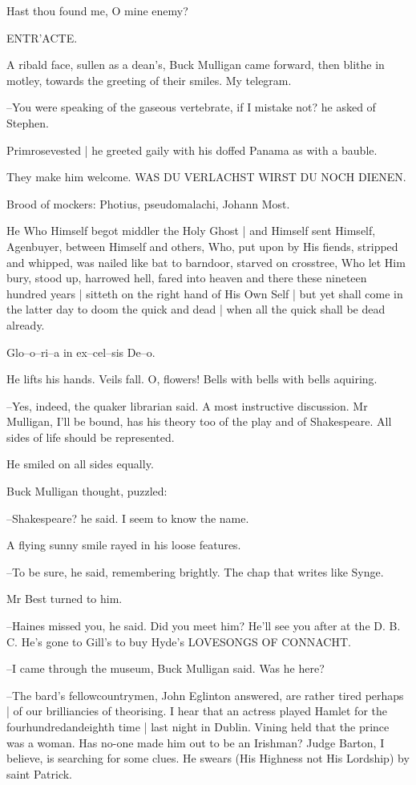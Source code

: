 Hast thou found me,
O mine enemy?

ENTR'ACTE.

A ribald face,
sullen as a dean's,
Buck Mulligan came forward,
then blithe in motley,
towards the greeting of their smiles.
My telegram.

--You were speaking of the gaseous vertebrate,
if I mistake not?
he asked of Stephen.

Primrosevested |
he greeted gaily with his doffed Panama as with a bauble.

They make him welcome.
WAS DU VERLACHST WIRST DU NOCH DIENEN.

Brood of mockers:
Photius,
pseudomalachi,
Johann Most.

He Who Himself begot middler the Holy Ghost |
and Himself sent Himself,
Agenbuyer,
between Himself and others,
Who,
put upon by His fiends,
stripped and whipped,
was nailed like bat to barndoor,
starved on crosstree,
Who let Him bury,
stood up,
harrowed hell,
fared into heaven and there these nineteen hundred years |
sitteth on the right hand of His Own Self |
but yet shall come in the latter day to doom the quick and dead |
when all the quick shall be dead already.

Glo--o--ri--a in ex--cel--sis De--o.

He lifts his hands.
Veils fall.
O, flowers!
Bells with bells with bells aquiring.

--Yes, indeed,
the quaker librarian said.
A most instructive discussion.
Mr Mulligan,
I'll be bound,
has his theory too of the play and of Shakespeare.
All sides of life should be represented.

He smiled on all sides equally.

Buck Mulligan thought,
puzzled:

--Shakespeare?
he said.
I seem to know the name.

A flying sunny smile rayed in his loose features.

--To be sure,
he said,
remembering brightly.
The chap that writes like Synge.

Mr Best turned to him.

--Haines missed you,
he said.
Did you meet him?
He'll see you after at the D. B. C.
He's gone to Gill's to buy Hyde's LOVESONGS OF CONNACHT.

--I came through the museum,
Buck Mulligan said.
Was he here?

--The bard's fellowcountrymen,
John Eglinton answered,
are rather tired perhaps |
of our brilliancies of theorising.
I hear that an actress played Hamlet for the fourhundredandeighth time |
last night in Dublin.
Vining held that the prince was a woman.
Has no-one made him out to be an Irishman?
Judge Barton,
I believe,
is searching for some clues.
He swears
(His Highness not His Lordship)
by saint Patrick.

